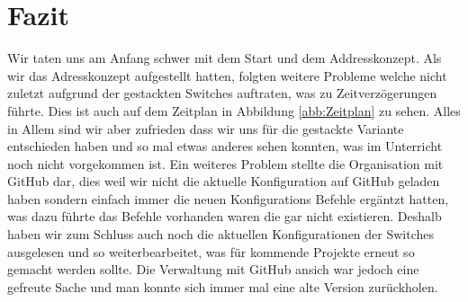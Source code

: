 \documentclass[11pt,a4paper]{scrreprt}
\begin{document}
\newpage
\chapter{Fazit}
Wir taten uns am Anfang schwer mit dem Start und dem Addresskonzept. Als wir das Adresskonzept aufgestellt hatten, folgten weitere Probleme welche nicht zuletzt aufgrund der gestackten Switches auftraten, was zu Zeitverzögerungen führte. Dies ist auch auf dem Zeitplan in Abbildung \ref{abb:Zeitplan} zu sehen. Alles in Allem sind wir aber zufrieden dass wir uns für die gestackte Variante entschieden haben und so mal etwas anderes sehen konnten, was im Unterricht noch nicht vorgekommen ist. Ein weiteres Problem stellte die Organisation mit GitHub dar, dies weil wir nicht die aktuelle Konfiguration auf GitHub geladen haben sondern einfach immer die neuen Konfigurations Befehle ergäntzt hatten, was dazu führte das Befehle vorhanden waren die gar nicht existieren. Deshalb haben wir zum Schluss auch noch die aktuellen Konfigurationen der Switches ausgelesen und so weiterbearbeitet, was für kommende Projekte erneut so gemacht werden sollte. Die Verwaltung mit GitHub ansich war jedoch eine gefreute Sache und man konnte sich immer mal eine alte Version zurückholen.

\appendix
{}
\end{document}
